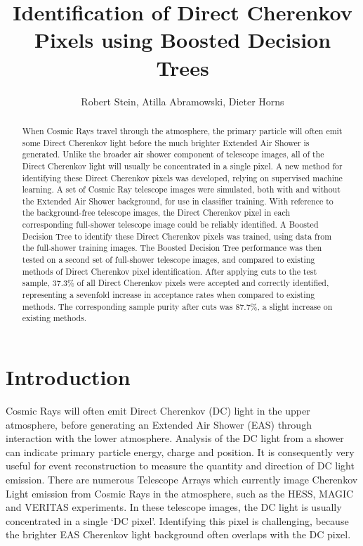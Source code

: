 \documentclass[]{article}
\title{Identification of Direct Cherenkov Pixels using Boosted Decision Trees}
\author{Robert Stein, Atilla Abramowski, Dieter Horns}
\begin{document}
\maketitle

\begin{abstract}
When Cosmic Rays travel through the atmosphere, the primary particle will often emit some Direct Cherenkov light before the much brighter Extended Air Shower is generated. Unlike the broader air shower component of telescope images, all of the Direct Cherenkov light will usually be concentrated in a single pixel. A new method for identifying these Direct Cherenkov pixels was developed, relying on supervised machine learning. A set of Cosmic Ray telescope images were simulated, both with and without the Extended Air Shower background, for use in classifier training. With reference to the background-free telescope images, the Direct Cherenkov pixel in each corresponding full-shower telescope image could be reliably identified. A Boosted Decision Tree to identify these Direct Cherenkov pixels was trained, using data from the full-shower training images. The Boosted Decision Tree performance was then tested on a second set of full-shower telescope images, and compared to existing methods of Direct Cherenkov pixel identification. After applying cuts to the test sample, 37.3\% of all Direct Cherenkov pixels were accepted and correctly identified, representing a sevenfold increase in acceptance rates when compared to existing methods. The corresponding sample purity after cuts was 87.7\%, a slight increase on existing methods.
\end{abstract}
\section{Introduction}
Cosmic Rays will often emit Direct Cherenkov (DC) light in the upper atmosphere, before generating an Extended Air Shower (EAS) through interaction with the lower atmosphere. Analysis of the DC light from a shower can indicate primary particle energy, charge and position. It is consequently very useful for event reconstruction to measure the quantity and direction of DC light emission. There are numerous Telescope Arrays which currently image Cherenkov Light emission from Cosmic Rays in the atmosphere, such as the HESS, MAGIC and VERITAS experiments. In these telescope images, the DC light is usually concentrated in a single  \textquoteleft DC pixel'. Identifying this pixel is challenging, because the brighter EAS Cherenkov light background often overlaps with the DC pixel. 
\end{document}

